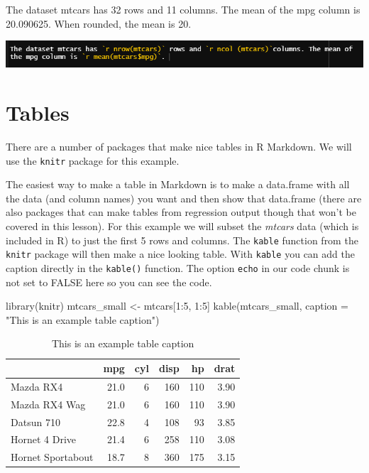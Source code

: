 \documentclass[
]{krantz}
\makeatletter
\newenvironment{Shaded}{\begin{snugshade}}{\end{snugshade}}
\newcommand{\AttributeTok}[1]{\textcolor[rgb]{0.61,0.61,0.61}{#1}}
\newcommand{\DecValTok}[1]{\textcolor[rgb]{0.06,0.06,0.06}{#1}}
\newcommand{\FunctionTok}[1]{\textcolor[rgb]{0,0,0}{#1}}
\newcommand{\NormalTok}[1]{#1}
\newcommand{\OtherTok}[1]{\textcolor[rgb]{0.37,0.37,0.37}{#1}}
\newcommand{\SpecialCharTok}[1]{\textcolor[rgb]{0,0,0}{#1}}
\newcommand{\StringTok}[1]{\textcolor[rgb]{0.5,0.5,0.5}{#1}}
\newenvironment{kframe}{%
\medskip{}
\setlength{\fboxsep}{.8em}
 \def\at@end@of@kframe{}%
 \ifinner\ifhmode%
  \def\at@end@of@kframe{\end{minipage}}%
  \begin{minipage}{\columnwidth}%
 \fi\fi%
 \def\FrameCommand##1{\hskip\@totalleftmargin \hskip-\fboxsep
 \colorbox{shadecolor}{##1}\hskip-\fboxsep
     \hskip-\linewidth \hskip-\@totalleftmargin \hskip\columnwidth}%
 \MakeFramed {\advance\hsize-\width
   \@totalleftmargin\z@ \linewidth\hsize
   \@setminipage}}%
 {\par\unskip\endMakeFramed%
 \at@end@of@kframe}
\renewenvironment{Shaded}{\begin{kframe}}{\end{kframe}}
\makeatother
\begin{document}
The dataset mtcars has 32 rows and 11 columns. The mean of the mpg column is 20.090625. When rounded, the mean is 20.

\includegraphics{images/inline_code.PNG}

\hypertarget{tables}{%
\section{Tables}\label{tables}}

There are a number of packages that make nice tables in R Markdown. We will use the \texttt{knitr} package for this example.

The easiest way to make a table in Markdown is to make a data.frame with all the data (and column names) you want and then show that data.frame (there are also packages that can make tables from regression output though that won't be covered in this lesson). For this example we will subset the \emph{mtcars} data (which is included in R) to just the first 5 rows and columns. The \texttt{kable} function from the \texttt{knitr} package will then make a nice looking table. With \texttt{kable} you can add the caption directly in the \texttt{kable()} function. The option \texttt{echo} in our code chunk is not set to FALSE here so you can see the code.

\begin{Shaded}
\begin{Highlighting}[]
\FunctionTok{library}\NormalTok{(knitr)}
\NormalTok{mtcars\_small }\OtherTok{\textless{}{-}}\NormalTok{ mtcars[}\DecValTok{1}\SpecialCharTok{:}\DecValTok{5}\NormalTok{, }\DecValTok{1}\SpecialCharTok{:}\DecValTok{5}\NormalTok{]}
\FunctionTok{kable}\NormalTok{(mtcars\_small, }\AttributeTok{caption =} \StringTok{"This is an example table caption"}\NormalTok{)}
\end{Highlighting}
\end{Shaded}

\begin{table}

\caption{\label{tab:unnamed-chunk-1}This is an example table caption}
\centering
\begin{tabular}[t]{l|r|r|r|r|r}
\hline
  & mpg & cyl & disp & hp & drat\\
\hline
Mazda RX4 & 21.0 & 6 & 160 & 110 & 3.90\\
\hline
Mazda RX4 Wag & 21.0 & 6 & 160 & 110 & 3.90\\
\hline
Datsun 710 & 22.8 & 4 & 108 & 93 & 3.85\\
\hline
Hornet 4 Drive & 21.4 & 6 & 258 & 110 & 3.08\\
\hline
Hornet Sportabout & 18.7 & 8 & 360 & 175 & 3.15\\
\hline
\end{tabular}
\end{table}
\end{document}
